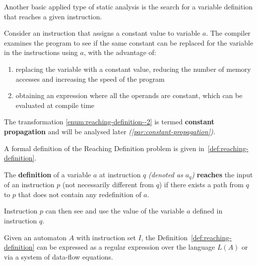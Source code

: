 \documentclass[english]{article}
\begin{document}
Another basic applied type of static analysis is the search for a variable definition that reaches a given instruction.

Consider an instruction that assigns a constant value to variable \(a\).
The compiler examines the program to see if the same constant can be replaced for the variable in the instructions using \(a\), with the advantage of:

\begin{enumerate}[label=\arabic*., ref=\arabic*.]
  \item\label{enum:reaching-definition--1} replacing the variable with a constant value, reducing the number of memory accesses and increasing the speed of the program
  \item\label{enum:reaching-definition--2} obtaining an expression where all the operands are constant, which can be evaluated at compile time
\end{enumerate}

The transformation \ref{enum:reaching-definition--2} is termed \textbf{constant propagation} and will be analysed later \textit{(\ref{par:constant-propagation})}.

A formal definition of the Reaching Definition problem is given in~\ref{def:reaching-definition}.

\begin{definition}
  \label{def:reaching-definition}
  The \textbf{definition} of a variable \(a\) at instruction \(q\) \textit{(denoted as \(a_q\))} \textbf{reaches} the input of an instruction \(p\) (not necessarily different from \(q\)) if there exists a path from \(q\) to \(p\) that does not contain any redefinition of \(a\).
\end{definition}

Instruction \(p\) can then see and use the value of the variable \(a\) defined in instruction \(q\).

Given an automaton \(A\) with instruction set \(I\), the Definition~\ref{def:reaching-definition} can be expressed as a regular expression over the language \(L(A)\) or via a system of data-flow equations.
\end{document}
